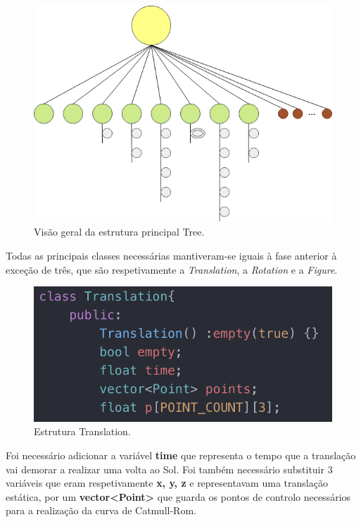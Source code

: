 \documentclass[a4paper]{article}
\begin{document}
\begin{figure}[H]
\centering
\includegraphics[scale=0.6]{tree_struct.png}
\caption{Visão geral da estrutura principal Tree.}
\label{img:tree_struct}
\end{figure}

Todas as principais classes necessárias mantiveram-se iguais à fase anterior à exceção de três, que são respetivamente a \textit{Translation}, a \textit{Rotation} e a \textit{Figure}.

\begin{figure}[H]
\centering
\includegraphics[scale=0.75]{translation.png}
\caption{Estrutura Translation.}
\label{img:translation}
\end{figure}

Foi necessário adicionar a variável \textbf{time} que representa o tempo que a translação vai demorar a realizar uma volta ao Sol. Foi também necessário substituir 3 variáveis que eram respetivamente \textbf{x, y, z} e representavam uma translação estática, por um \textbf{vector<Point>} que guarda os pontos de controlo necessários para a realização da curva de Catmull-Rom.
\end{document}

